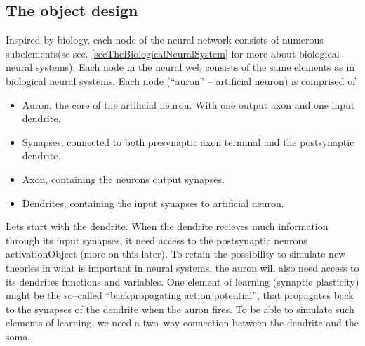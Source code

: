 	\subsection{The object design}
	\label{ssecTheObjectDesign}
		Inspired by biology, each node of the neural network consists of numerous subelements(se sec. \ref{secTheBiologicalNeuralSystem} for more about biological neural systems). 
		Each node in the neural web consists of the same elements as in biological neural systems. 
		Each node (``auron'' -- artificial neuron) is comprised of 
		\begin{itemize}
			\item Auron, the core of the artificial neuron. With one output axon and one input dendrite.
			\item Synapses, connected to both presynaptic axon terminal and the postsynaptic dendrite.
			\item Axon, containing the neurons output synapses. %
			\item Dendrites, containing the input synapses to artificial neuron.
		\end{itemize}
		

		Lets start with the dendrite. When the dendrite recieves much information through its input synapses, it need access to the postsynaptic neurons activationObject (more on this later). %
		To retain the possibility to simulate new theories in what is important in neural systems, the auron will also need access to its dendrites functions and variables. 
		One element of learning (synaptic plasticity) might be the so--called ``backpropagating action potential'', that propagates back to the synapses of the dendrite when the auron fires.
		To be able to simulate such elements of learning, we need a two--way connection between the dendrite and the soma.


